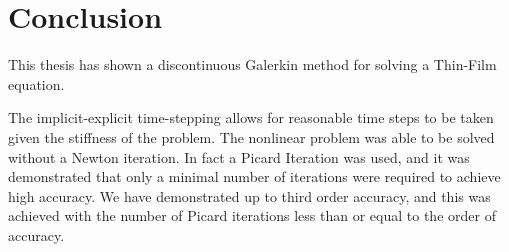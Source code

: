 \chapter{Conclusion}
\label{conclusion}
This thesis has shown a discontinuous Galerkin method for solving a Thin-Film equation.

The implicit-explicit time-stepping allows for reasonable time steps to be taken given
the stiffness of the problem.
The nonlinear problem was able to be solved without a Newton iteration.
In fact a Picard Iteration was used, and it was demonstrated that only a minimal
number of iterations were required to achieve high accuracy.
We have demonstrated up to third order accuracy, and this was achieved with the number
of Picard iterations less than or equal to the order of accuracy.

\clearpage
\pagebreak
